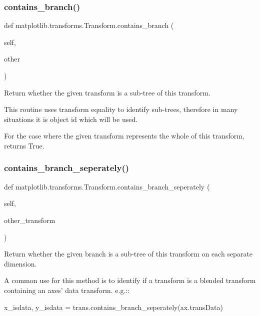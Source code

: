 \subsubsection{\texorpdfstring{contains\+\_\+branch()}{contains\_branch()}}
{\footnotesize\ttfamily def matplotlib.\+transforms.\+Transform.\+contains\+\_\+branch (\begin{DoxyParamCaption}\item[{}]{self,  }\item[{}]{other }\end{DoxyParamCaption})}

\begin{DoxyVerb}Return whether the given transform is a sub-tree of this transform.

This routine uses transform equality to identify sub-trees, therefore
in many situations it is object id which will be used.

For the case where the given transform represents the whole
of this transform, returns True.
\end{DoxyVerb}
 \mbox{\label{classmatplotlib_1_1transforms_1_1Transform_a7c31b4e3f8b8b73cd7dca724be0d9a17}} 
\subsubsection{\texorpdfstring{contains\+\_\+branch\+\_\+seperately()}{contains\_branch\_seperately()}}
{\footnotesize\ttfamily def matplotlib.\+transforms.\+Transform.\+contains\+\_\+branch\+\_\+seperately (\begin{DoxyParamCaption}\item[{}]{self,  }\item[{}]{other\+\_\+transform }\end{DoxyParamCaption})}

\begin{DoxyVerb}Return whether the given branch is a sub-tree of this transform on
each separate dimension.

A common use for this method is to identify if a transform is a blended
transform containing an axes' data transform. e.g.::

    x_isdata, y_isdata = trans.contains_branch_seperately(ax.transData)\end{DoxyVerb}
 \mbox{\label{classmatplotlib_1_1transforms_1_1Transform_afddcaf14031c8ee61890b0306adb71ed}} 
